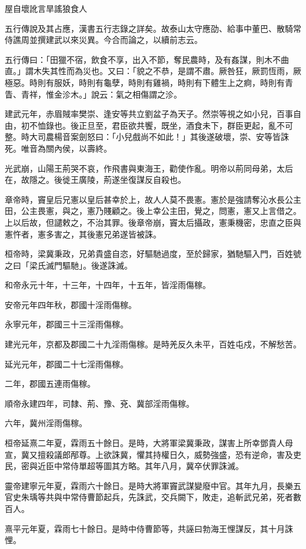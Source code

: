 
\begin{pinyinscope}
屋自壞訛言旱謠狼食人

五行傳說及其占應，漢書五行志錄之詳矣。故泰山太守應劭、給事中董巴、散騎常侍譙周並撰建武以來災異。今合而論之，以續前志云。

五行傳曰：「田獵不宿，飲食不享，出入不節，奪民農時，及有姦謀，則木不曲直。」謂木失其性而為災也。又曰：「貌之不恭，是謂不肅。厥咎狂，厥罰恆雨，厥極惡。時則有服妖，時則有龜孽，時則有雞禍，時則有下體生上之痾，時則有青眚、青祥，惟金沴木。」說云：氣之相傷謂之沴。

建武元年，赤眉賊率樊崇、逢安等共立劉盆子為天子。然崇等視之如小兒，百事自由，初不恤錄也。後正旦至，君臣欲共饗，既坐，酒食未下，群臣更起，亂不可整。時大司農楊音案劍怒曰：「小兒戲尚不如此！」其後遂破壞，崇、安等皆誅死。唯音為關內侯，以壽終。

光武崩，山陽王荊哭不哀，作飛書與東海王，勸使作亂。明帝以荊同母弟，太后在，故隱之。後徙王廣陵，荊遂坐復謀反自殺也。

章帝時，竇皇后兄憲以皇后甚幸於上，故人人莫不畏憲。憲於是強請奪沁水長公主田，公主畏憲，與之，憲乃賤顧之。後上幸公主田，覺之，問憲，憲又上言借之。上以后故，但譴敕之，不治其罪。後章帝崩，竇太后攝政，憲秉機密，忠直之臣與憲忤者，憲多害之，其後憲兄弟遂皆被誅。

桓帝時，梁冀秉政，兄弟貴盛自恣，好驅馳過度，至於歸家，猶馳驅入門，百姓號之曰「梁氏滅門驅馳」。後遂誅滅。

和帝永元十年，十三年，十四年，十五年，皆淫雨傷稼。

安帝元年四年秋，郡國十淫雨傷稼。

永寧元年，郡國三十三淫雨傷稼。

建光元年，京都及郡國二十九淫雨傷稼。是時羌反久未平，百姓屯戍，不解愁苦。

延光元年，郡國二十七淫雨傷稼。

二年，郡國五連雨傷稼。

順帝永建四年，司隸、荊、豫、兗、冀部淫雨傷稼。

六年，冀州淫雨傷稼。

桓帝延熹二年夏，霖雨五十餘日。是時，大將軍梁冀秉政，謀害上所幸鄧貴人母宣，冀又擅殺議郎邴尊。上欲誅冀，懼其持權日久，威勢強盛，恐有逆命，害及吏民，密與近臣中常侍單超等圖其方略。其年八月，冀卒伏罪誅滅。

靈帝建寧元年夏，霖雨六十餘日。是時大將軍竇武謀變廢中官。其年九月，長樂五官史朱瑀等共與中常侍曹節起兵，先誅武，交兵闕下，敗走，追斬武兄弟，死者數百人。

熹平元年夏，霖雨七十餘日。是時中侍曹節等，共誣曰勃海王悝謀反，其十月誅悝。


\end{pinyinscope}
